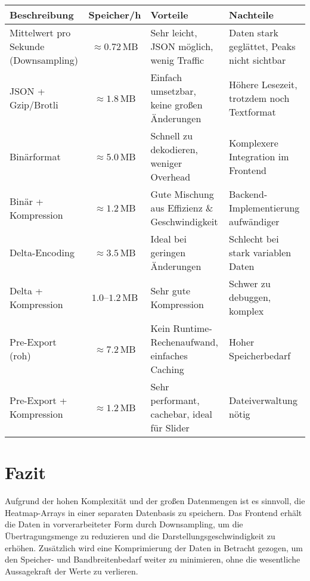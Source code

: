 \begin{center}
\begin{adjustbox}{max width=\textwidth}
\begin{tabular}{|l|c|p{5cm}|p{5cm}|}
\hline
\textbf{Beschreibung} & \textbf{Speicher/h} & \textbf{Vorteile} & \textbf{Nachteile} \\ \hline
Mittelwert pro Sekunde (Downsampling) & $\approx 0.72$\,MB & Sehr leicht, JSON möglich, wenig Traffic & Daten stark geglättet, Peaks nicht sichtbar \\ \hline
JSON + Gzip/Brotli & $\approx 1.8$\,MB & Einfach umsetzbar, keine großen Änderungen & Höhere Lesezeit, trotzdem noch Textformat \\ \hline
Binärformat & $\approx 5.0$\,MB & Schnell zu dekodieren, weniger Overhead & Komplexere Integration im Frontend \\ \hline
Binär + Kompression & $\approx 1.2$\,MB & Gute Mischung aus Effizienz \& Geschwindigkeit & Backend-Implementierung aufwändiger \\ \hline
Delta-Encoding & $\approx 3.5$\,MB & Ideal bei geringen Änderungen & Schlecht bei stark variablen Daten \\ \hline
Delta + Kompression & $1.0$–$1.2$\,MB & Sehr gute Kompression & Schwer zu debuggen, komplex \\ \hline
Pre-Export (roh) & $\approx 7.2$\,MB & Kein Runtime-Rechenaufwand, einfaches Caching & Hoher Speicherbedarf \\ \hline
Pre-Export + Kompression & $\approx 1.2$\,MB & Sehr performant, cachebar, ideal für Slider & Dateiverwaltung nötig \\ \hline
\end{tabular}
\end{adjustbox}
\end{center}

\section*{Fazit}
Aufgrund der hohen Komplexität und der großen Datenmengen ist es sinnvoll, die Heatmap-Arrays in einer separaten Datenbasis zu speichern. 
Das Frontend erhält die Daten in vorverarbeiteter Form durch Downsampling, um die Übertragungsmenge zu reduzieren und die Darstellungsgeschwindigkeit zu erhöhen. 
Zusätzlich wird eine Komprimierung der Daten in Betracht gezogen, um den Speicher- und Bandbreitenbedarf weiter zu minimieren, ohne die wesentliche Aussagekraft der Werte zu verlieren.
